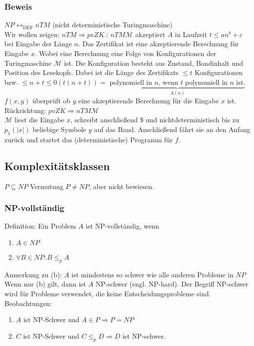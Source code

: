 \subsubsection{Beweis}
$NP \leftrightarrow_{\text{DEF}} nTM$ (nicht deterministische Turingmaschine)\\
Wir wollen zeigen: $nTM \Rightarrow pvZK.$: $nTM \mathcal{M}$ akzeptiert $A$ in Laufzeit $t \leq an^b+c$ bei Eingabe der Länge $n$. Das Zertifikat ist eine akzeptierende Berechnung für Eingabe $x$. Wobei eine Berechnung eine Folge von Konfigurationen der Turingmaschine $\mathcal{M}$ ist. Die Konfiguration besteht aus Zustand, Bandinhalt und Position des Lesekopfs. Dabei ist die Länge des Zertifikats $\leq t $ Konfigurationen bzw. $\leq n+t \leq 0(t(n+t)) = $ $\underbrace{\text{polynomiell in }n\text{, wenn }t\text{ polynomiell in }n\text{ ist.}}_{A(n)}$ $f(x,y)$ überprüft ob $y$ eine akzeptierende Berechnung für die Eingabe $x$ ist.\\
Rückrichtung: $pvZK \Rightarrow nTM \mathcal{M}$\\
$\mathcal{M}$ liest die Eingabe $x$, schreibt anschließend $\$$ und nichtdeterministisch bis zu $p_1(|x|)$ beliebige Symbole $y$ auf das Band. Anschließend fährt sie an den Anfang zurück und startet das (deterministische) Programm für $f$.\\
\subsection{Komplexitätsklassen}
$P \subseteq NP$
Vermutung $P \neq NP$, aber nicht bewiesen.
\subsubsection{NP-vollständig}
Definition: Ein Problem $A$ ist NP-vollständig, wenn 
\begin{enumerate}
\item $A \in NP$
\item $\forall B \in NP: B \leq_p A$
\end{enumerate}
Anmerkung zu (b): $A$ ist mindestens so schwer wie alle anderen Probleme in $NP$\\
Wenn nur (b) gilt, dann ist $A$ NP-schwer (engl. NP-hard). Der Begriff NP-schwer wird für Probleme verwendet, die keine Entscheidungsprobleme sind.\\
Beobachtungen:
\begin{enumerate}
\item $A$ ist NP-Schwer und $A \in P \Rightarrow P = NP$
\item $C$ ist NP-Schwer und $C \leq_p D \Rightarrow D$ ist NP-schwer.
\end{enumerate}
